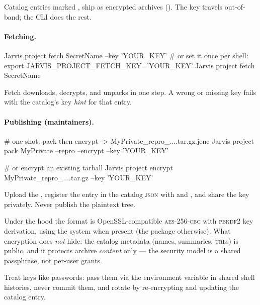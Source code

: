 Catalog entries marked ,  ship as
encrypted archives (). The key travels out-of-band; the CLI does
the rest.

\paragraph{Fetching.}

\begin{terminal}
\begin{jcmd}
Jarvis project fetch SecretName --key 'YOUR_KEY'
# or set it once per shell:
export JARVIS_PROJECT_FETCH_KEY='YOUR_KEY'
Jarvis project fetch SecretName
\end{jcmd}
\end{terminal}

Fetch downloads, decrypts, and unpacks in one step. A wrong or missing key fails with
the catalog's key \emph{hint} for that entry.

\paragraph{Publishing (maintainers).}

\begin{terminal}
\begin{jcmd}
# one-shot: pack then encrypt -> MyPrivate_repro_....tar.gz.jenc
Jarvis project pack MyPrivate --repro --encrypt --key 'YOUR_KEY'

# or encrypt an existing tarball
Jarvis project encrypt MyPrivate_repro_....tar.gz --key 'YOUR_KEY'
\end{jcmd}
\end{terminal}

Upload the , register the entry in the catalog \textsc{json} with
 and , and share the key privately.
Never publish the plaintext tree.

\begin{jnote}
Under the hood the format is OpenSSL-compatible \textsc{aes}-256-\textsc{cbc} with
\textsc{pbkdf2} key derivation, using the system  when present (the
 package otherwise). What encryption does \emph{not} hide: the
catalog metadata (names, summaries, \textsc{url}s) is public, and it protects archive
\emph{content} only --- the security model is a shared passphrase, not per-user grants.
\end{jnote}

\begin{jwarn}
Treat keys like passwords: pass them via the environment variable in shared shell
histories, never commit them, and rotate by re-encrypting and updating the catalog
entry.
\end{jwarn}
